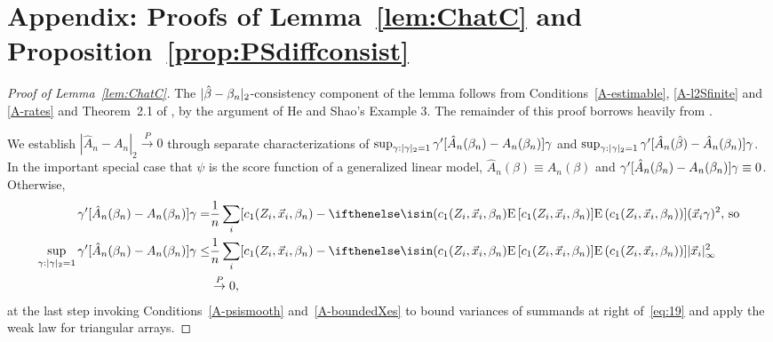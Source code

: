 \documentclass{article}
\theoremstyle{remark}
\begin{document}
\section*{Appendix: Proofs of Lemma~\ref{lem:ChatC} and Proposition~\ref{prop:PSdiffconsist}}
\begin{proof}[Proof of Lemma~\ref{lem:ChatC}]
The $|\hat\beta - \beta_{n }|_{2}$-consistency component of the lemma follows from Conditions~\ref{A-estimable}, \ref{A-l2Sfinite} and \ref{A-rates} and Theorem~2.1 of \citet{he2000parameters}, by the argument of He and Shao's Example 3.
The remainder of this proof borrows heavily from \citet[][Proof of Thm.~3.10]{wang2011gee}.

We establish $|\hat{A}_{n} - A_{n}|_{2} \stackrel{P}{\rightarrow} 0$ through separate characterizations of  
$\sup_{\gamma: |\gamma|_{2}=1}\gamma'[\hat{A}_{n}(\beta_{n }) - A_{n}(\beta_{n })]\gamma$ and $\sup_{\gamma: |\gamma|_{2}=1}\gamma'[\hat{A}_{n}(\hat\beta) - \hat{A}_{n}(\beta_{n })]\gamma$.  In the important special case that $\psi$ is the score function of a generalized linear model, $\hat{A}_{n}(\beta) \equiv A_{n}(\beta)$ and $\gamma'[\hat{A}_{n}(\beta_{n }) - A_{n}(\beta_{n })]\gamma \equiv 0$.  Otherwise, 
\begin{align}
  \gamma'[\hat{A}_{n}(\betatrue) - A_{n}(\betatrue)]\gamma =& \frac{1}{n} \sum_{i} [c_{1}(Z_{i}, \vec{x}_{i}, \betatrue) - \E{c_{1}(Z_{i}, \vec{x}_{i}, \betatrue)}](\vec{x}_{i}\gamma)^{2},\, \text{so} \nonumber \\
\sup_{\gamma: |\gamma|_{2}=1}\gamma'[\hat{A}_{n}(\betatrue) - A_{n}(\betatrue)]\gamma \leq&
\frac{1}{n} \sum_{i} [c_{1}(Z_{i}, \vec{x}_{i}, \betatrue) - \E{c_{1}(Z_{i}, \vec{x}_{i}, \betatrue)}]|\vec{x}_{i}|_{\infty}^{2} \label{eq:19}\\
& \stackrel{P}{\rightarrow} 0, \nonumber
\end{align}
at the last step invoking Conditions~\ref{A-psismooth} 
and~\ref{A-boundedXes}  %
to bound variances of summands at right of~\eqref{eq:19} and apply the weak law for triangular arrays. 


\end{proof}
\end{document}
